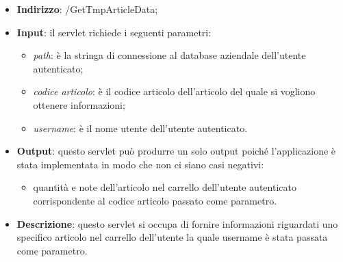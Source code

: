 
\begin{itemize}
	\item \textbf{Indirizzo}: /GetTmpArticleData;
	\item \textbf{Input}: il servlet richiede i seguenti parametri:
		\begin{itemize}
			\item \textit{path}: è la stringa di connessione al database aziendale dell'utente autenticato;
			\item \textit{codice articolo}: è il codice articolo dell'articolo del quale si vogliono ottenere informazioni;
			\item \textit{username}: è il nome utente dell'utente autenticato.
		\end{itemize}
	\item \textbf{Output}: questo servlet può produrre un solo output poiché l'applicazione è stata implementata in modo che non ci siano casi negativi:
		\begin{itemize}
			\item quantità e note dell'articolo nel carrello dell'utente autenticato corrispondente al codice articolo passato come parametro.
		\end{itemize}
	\item \textbf{Descrizione}: questo servlet si occupa di fornire informazioni riguardati uno specifico articolo nel carrello dell'utente la quale username è stata passata come parametro.
\end{itemize}


